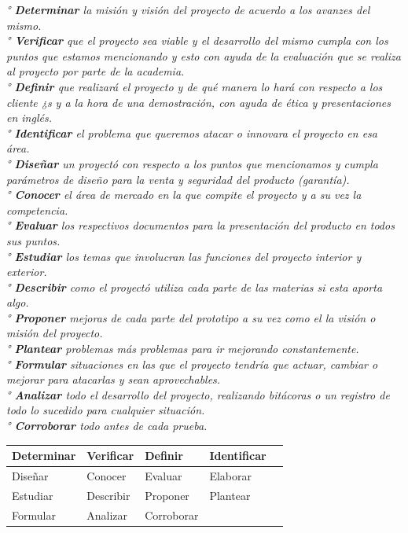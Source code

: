 \documentclass[11pt,a4paper]{article}
\begin{document}
\textit{° \textbf{Determinar} la misión y visión del proyecto de acuerdo a los avanzes del mismo.\\
° \textbf{Verificar} que el proyecto sea viable y el desarrollo del mismo cumpla con los puntos que estamos mencionando y esto con ayuda de la evaluación que se realiza al proyecto por parte de la academia.\\
° \textbf{Definir} que realizará el proyecto y de qué manera lo hará con respecto a los cliente ¿s y a la hora de una demostración, con ayuda de ética y presentaciones en inglés.\\
° \textbf{Identificar} el problema que queremos atacar o innovara el proyecto en esa área.\\
° \textbf{Diseñar} un proyectó con respecto a los puntos que mencionamos y cumpla parámetros de diseño para la venta y seguridad del producto (garantía).\\
° \textbf{Conocer} el área de mercado en la que compite el proyecto y a su vez la competencia.\\
° \textbf{Evaluar} los respectivos documentos para la presentación del producto en todos sus puntos.\\
° \textbf{Estudiar} los temas que involucran las funciones del proyecto interior y exterior.\\
° \textbf{Describir} como el proyectó utiliza cada parte de las materias si esta aporta algo.\\
° \textbf{Proponer} mejoras de cada parte del prototipo a su vez como el la visión o misión del proyecto.\\
° \textbf{Plantear} problemas más problemas para ir mejorando constantemente.\\
° \textbf{Formular} situaciones en las que el proyecto tendría que actuar, cambiar o mejorar para atacarlas y sean aprovechables.\\
° \textbf{Analizar} todo el desarrollo del proyecto, realizando bitácoras o un registro de todo lo sucedido para cualquier situación.\\
° \textbf{Corroborar} todo antes de cada prueba.\\ }



\begin{table}
\centering
\begin{tabular}{lllll}
Determinar & Verificar & Definir & Identificar \\ \hline 
Diseñar & Conocer & Evaluar & Elaborar \\ \hline
Estudiar & Describir & Proponer & Plantear \\ \hline
Formular & Analizar & Corroborar &  \\ \hline
\end{tabular}
\end{table}
\end{document}
